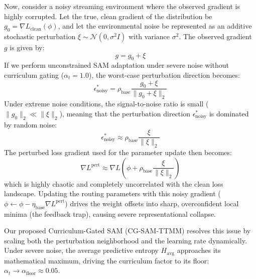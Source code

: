 \documentclass{article}
\theoremstyle{plain}
\theoremstyle{definition}
\theoremstyle{remark}
\begin{document}
Now, consider a noisy streaming environment where the observed gradient is highly corrupted. Let the true, clean gradient of the distribution be $g_0 = \nabla L_{\text{clean}}(\phi)$, and let the environmental noise be represented as an additive stochastic perturbation $\xi \sim \mathcal{N}(0, \sigma^2 I)$ with variance $\sigma^2$. The observed gradient $g$ is given by:
\begin{equation}
    g = g_0 + \xi
\end{equation}
If we perform unconstrained SAM adaptation under severe noise without curriculum gating ($\alpha_t = 1.0$), the worst-case perturbation direction becomes:
\begin{equation}
    \epsilon_{\text{noisy}}^* = \rho_{\text{base}} \frac{g_0 + \xi}{\|g_0 + \xi\|_2}
\end{equation}
Under extreme noise conditions, the signal-to-noise ratio is small ($\|g_0\|_2 \ll \|\xi\|_2$), meaning that the perturbation direction $\epsilon_{\text{noisy}}^*$ is dominated by random noise:
\begin{equation}
    \epsilon_{\text{noisy}}^* \approx \rho_{\text{base}} \frac{\xi}{\|\xi\|_2}
\end{equation}
The perturbed loss gradient used for the parameter update then becomes:
\begin{equation}
    \nabla L^{\text{pert}} \approx \nabla L(\phi + \rho_{\text{base}} \frac{\xi}{\|\xi\|_2})
\end{equation}
which is highly chaotic and completely uncorrelated with the clean loss landscape. Updating the routing parameters with this noisy gradient ($\phi \leftarrow \phi - \eta_{\text{base}} \nabla L^{\text{pert}}$) drives the weight offsets into sharp, overconfident local minima (the feedback trap), causing severe representational collapse.

Our proposed Curriculum-Gated SAM (CG-SAM-TTMM) resolves this issue by scaling both the perturbation neighborhood and the learning rate dynamically. Under severe noise, the average predictive entropy $H_{\text{avg}}$ approaches its mathematical maximum, driving the curriculum factor to its floor: $\alpha_t \to \alpha_{\text{floor}} \approx 0.05$.
\end{document}

